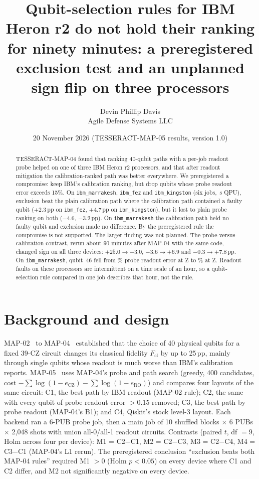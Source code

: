 \documentclass[10pt,twocolumn]{article}
\title{\bfseries Qubit-selection rules for IBM Heron r2 do not hold their ranking for ninety minutes:
a preregistered exclusion test and an unplanned sign flip on three processors}
\author{Devin Phillip Davis\\ \small Agile Defense Systems LLC}
\date{20 November 2026 \quad (TESSERACT-MAP-05 results, version 1.0)}
\begin{document}
\maketitle

\begin{abstract}
\noindent
TESSERACT-MAP-04 found that ranking 40-qubit paths with a per-job readout probe helped on one of
three IBM Heron r2 processors, and that after readout mitigation the calibration-ranked path was
better everywhere. We preregistered a compromise: keep IBM's calibration ranking, but drop qubits
whose probe readout error exceeds 15\%. On \texttt{ibm\_marrakesh}, \texttt{ibm\_fez} and
\texttt{ibm\_kingston} (six jobs, \TotalSeconds{}\,s QPU), exclusion beat the plain calibration path
where the calibration path contained a faulty qubit ($+2.3$\,pp on \texttt{ibm\_fez}, $+4.7$\,pp on
\texttt{ibm\_kingston}), but it lost to plain probe ranking on both ($-4.6$, $-3.2$\,pp). On
\texttt{ibm\_marrakesh} the calibration path held no faulty qubit and exclusion made no difference.
By the preregistered rule the compromise is not supported. The larger finding was not planned. The
probe-versus-calibration contrast, rerun about 90 minutes after MAP-04 with the same code, changed
sign on all three devices: $+25.0\to-3.0$, $-3.6\to+6.9$ and $-0.3\to+7.8$\,pp. On
\texttt{ibm\_marrakesh}, qubit~46 fell from \QFSixFour\% probe readout error at \TFour{}Z to
\QFSixFive\% at \TFive{}Z. Readout faults on these processors are intermittent on a time scale of an
hour, so a qubit-selection rule compared in one job describes that hour, not the rule.
\end{abstract}

\section{Background and design}
MAP-02~\cite{map02} to MAP-04~\cite{map04} established that the choice of 40 physical qubits for a
fixed 39-CZ circuit changes its classical fidelity $F_{\mathrm{cl}}$ by up to 25\,pp, mainly through
single qubits whose readout is much worse than IBM's calibration reports. MAP-05~\cite{prereg} uses
MAP-04's probe and path search (greedy, 400 candidates, cost
$-\sum\log(1-e_{\mathrm{CZ}})-\sum\log(1-e_{\mathrm{RO}})$) and compares four layouts of the same
circuit: C1, the best path by IBM readout (MAP-02 rule); C2, the same with every qubit of probe readout
error $>0.15$ removed; C3, the best path by probe readout (MAP-04's B1); and C4, Qiskit's stock level-3
layout. Each backend ran a 6-PUB probe job, then a main job of 10 shuffled blocks $\times$ 6 PUBs
$\times$ 2{,}048 shots with union all-0/all-1 readout circuits. Contrasts (paired $t$, df $=9$, Holm
across four per device): M1 = C2$-$C1, M2 = C2$-$C3, M3 = C2$-$C4, M4 = C3$-$C1 (MAP-04's L1 rerun).
The preregistered conclusion ``exclusion beats both MAP-04 rules'' required M1 $>0$ (Holm $p<0.05$)
on every device where C1 and C2 differ, and M2 not significantly negative on every device.
\end{document}
